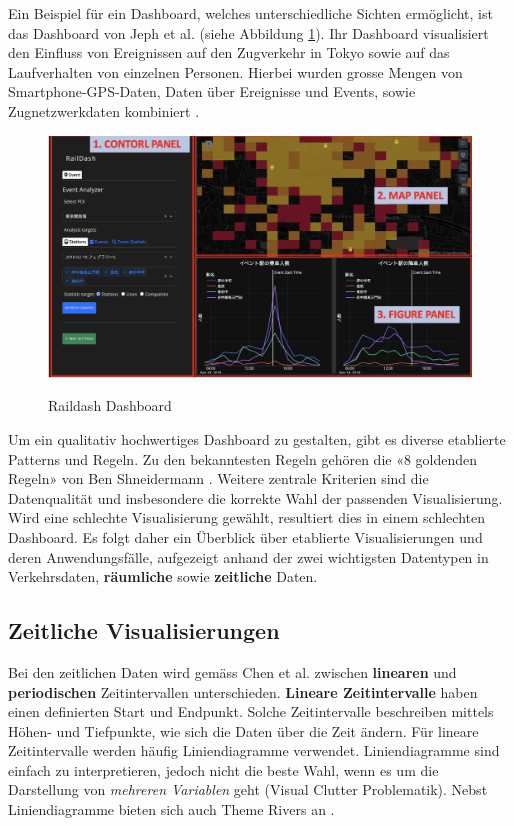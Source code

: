 Ein Beispiel für ein Dashboard, welches unterschiedliche Sichten ermöglicht, ist das Dashboard von Jeph et al. (siehe Abbildung \ref{fig_raildash}). Ihr Dashboard visualisiert den Einfluss von Ereignissen auf den Zugverkehr in Tokyo sowie auf das Laufverhalten von einzelnen Personen. Hierbei wurden grosse Mengen von Smartphone-GPS-Daten, Daten über Ereignisse und Events, sowie Zugnetzwerkdaten kombiniert \parencite{raildash_2022}.

\begin{figure}[H]
    \caption{Raildash Dashboard \parencite[S. 93]{raildash_2022}}
    \includegraphics[width=.5\linewidth]{content/00_assets/raildash.png}
    \label{fig_raildash}
\end{figure}

Um ein qualitativ hochwertiges Dashboard zu gestalten, gibt es diverse etablierte Patterns und Regeln. Zu den bekanntesten Regeln gehören die «8 goldenden Regeln» von Ben Shneidermann \parencite{golden_rules_dashboard}. Weitere zentrale Kriterien sind die Datenqualität und insbesondere die korrekte Wahl der passenden Visualisierung. Wird eine schlechte Visualisierung gewählt, resultiert dies in einem schlechten Dashboard. Es folgt daher ein Überblick über etablierte Visualisierungen und deren Anwendungsfälle, aufgezeigt anhand der zwei wichtigsten Datentypen in Verkehrsdaten, \textbf{räumliche} sowie \textbf{zeitliche} Daten. 

\subsection{Zeitliche Visualisierungen}
Bei den zeitlichen Daten wird gemäss Chen et al. zwischen \textbf{linearen} und \textbf{periodischen} Zeitintervallen unterschieden. \textbf{Lineare Zeitintervalle} haben einen definierten Start und Endpunkt. Solche Zeitintervalle beschreiben mittels Höhen- und Tiefpunkte, wie sich die Daten über die Zeit ändern. Für lineare Zeitintervalle werden häufig Liniendiagramme verwendet. Liniendiagramme sind einfach zu interpretieren, jedoch nicht die beste Wahl, wenn es um die Darstellung von \textit{mehreren Variablen} geht (Visual Clutter Problematik). Nebst Liniendiagramme bieten sich auch Theme Rivers an \parencite[S. 2973]{survey_traffic_data_visualization_2015}.

